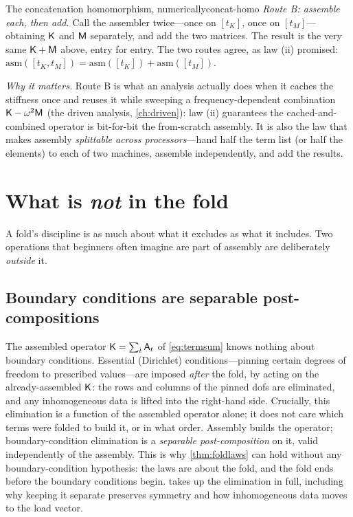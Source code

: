 \begin{workedexample}{The concatenation homomorphism, numerically}{concat-homo}
\emph{Route B: assemble each, then add.} Call the assembler twice---once on
$[t_K]$, once on $[t_M]$---obtaining $\mathsf{K}$ and $\mathsf{M}$ separately, and add
the two matrices. The result is the very same $\mathsf{K}+\mathsf{M}$ above, entry for
entry. The two routes agree, as law (ii) promised: $\mathrm{asm}([t_K,t_M])
=\mathrm{asm}([t_K])+\mathrm{asm}([t_M])$.

\emph{Why it matters.} Route B is what an analysis actually does when it caches
the stiffness once and reuses it while sweeping a frequency-dependent combination
$\mathsf{K}-\omega^2\mathsf{M}$ (the driven analysis, \cref{ch:driven}): law (ii)
guarantees the cached-and-combined operator is bit-for-bit the from-scratch
assembly. It is also the law that makes assembly \emph{splittable across
processors}---hand half the term list (or half the elements) to each of two
machines, assemble independently, and add the results.
\end{workedexample}

\section{What is \emph{not} in the fold}
\label{sec:notinfold}

A fold's discipline is as much about what it excludes as what it includes. Two
operations that beginners often imagine are part of assembly are deliberately
\emph{outside} it.

\subsection{Boundary conditions are separable post-compositions}

The assembled operator $\mathsf{K}=\sum_t\mathsf{A}_t$ of \cref{eq:termsum} knows
nothing about boundary conditions. Essential (Dirichlet) conditions---pinning
certain degrees of freedom to prescribed values---are imposed \emph{after} the
fold, by acting on the already-assembled $\mathsf{K}$: the rows and columns of the
pinned dofs are eliminated, and any inhomogeneous data is lifted into the
right-hand side. Crucially, this elimination is a function of the assembled
operator alone; it does not care which terms were folded to build it, or in what
order. Assembly builds the operator; boundary-condition elimination is a
\emph{separable post-composition} on it, valid independently of the assembly. This
is why \cref{thm:foldlaws} can hold without any boundary-condition hypothesis: the
laws are about the fold, and the fold ends before the boundary conditions begin.
 takes up the elimination in full, including why keeping it separate
preserves symmetry and how inhomogeneous data moves to the load vector.

